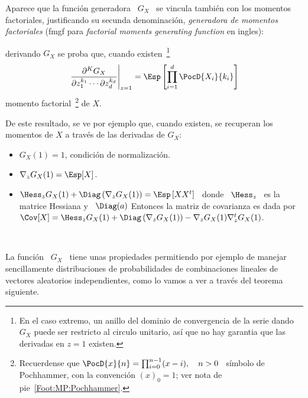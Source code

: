 Aparece  que la  funci\'on generadora  \ $G_X$  \ se  vincula tambi\'en  con los
momentos factoriales, justificando su secunda denominaci\'on, {\em generadora de
  momentos factoriales}  (fmgf para {\em factorial  moments generating function}
en ingles):
%
\begin{lema}
\label{Lem:MP:GeneracionMomentosFactoriales}
%
  derivando $G_X$ se proba que,  cuando existen~\footnote{En el caso extremo, un
    anillo  del  dominio de  convergencia  de la  serie  dando  $G_X$ puede  ser
    restricto al circulo  unitario, as\'i que no hay  garantia que las derivadas
    en $z = 1$ existen.}
  \[
  \left.\frac{\partial^K     G_X}{\partial     z_1^{k_1}     \cdots     \partial
      z_d^{k_d}}\right|_{z=1} = \Esp\left[ \prod_{i=1}^d \PocD{X_i}{k_i} \right]
  \]
  momento  factorial~\footnote{Recuerdense que $\PocD{x}{n}  = \prod_{i=0}^{n-1}
    (x-i), \quad n > 0$ \  s\'imbolo de Pochhammer, con la convenci\'on $(x)_0 =
    1$; ver nota de pie~\ref{Foot:MP:Pochhammer}.} de $X$.
\end{lema}

De  este resultado,  se ve  por ejemplo  que, cuando  existen, se  recuperan los
momentos de $X$ a trav\'es de las derivadas de $G_X$:
%
\begin{itemize}
\item $G_X(1) = 1$, condici\'on de normalizaci\'on.
%
\item $\nabla_z G_X(1) = \Esp[X]$.
%
\item $\Hess_z G_X(1)  + \Diag\left( \nabla_z G_X(1) \right)  = \Esp\left[ X X^t
  \right]$  \  donde  \ $\Hess_z$  \  es  la  matrice  Hessiana y  \  $\Diag(a)$
  Entonces la  matriz de covarianza  es dada por  \ $\Cov[X] = \Hess_z  G_X(1) +
  \Diag\left( \nabla_z G_X(1) \right) - \nabla_z G_X(1) \nabla_z^t G_X(1)$.
\end{itemize}

\

La funci\'on \ $G_X$ \ tiene unas propiedades permitiendo por ejemplo de manejar
sencillamente  distribuciones  de probabilidades  de  combinaciones lineales  de
vectores aleatorios independientes,  como lo vamos a ver  a trav\'es del teorema
siguiente.

